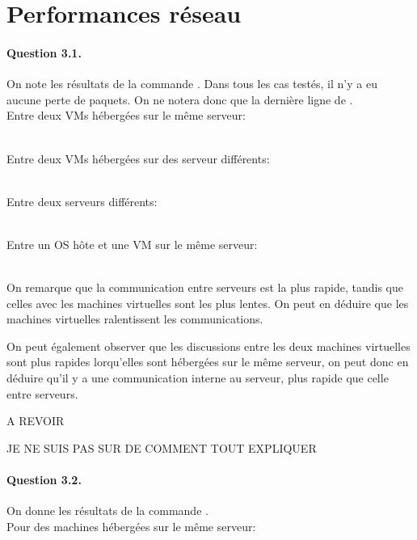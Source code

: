 \documentclass[12pt]{article}
\begin{document}
\section{Performances réseau}
\paragraph{Question 3.1.}
On note les résultats de la commande . Dans tous les cas testés, il n'y a eu aucune perte de paquets. On ne notera donc que la dernière ligne de .
\\

Entre deux VMs hébergées sur le même serveur:

\\

Entre deux VMs hébergées sur des serveur différents:

\\

Entre deux serveurs différents:

\\

Entre un OS hôte et une VM sur le même serveur:

\\

On remarque que la communication entre serveurs est la plus rapide, tandis que celles avec les machines virtuelles sont les plus lentes. On peut en déduire que les machines virtuelles ralentissent les communications.

On peut également observer que les discussions entre les deux machines virtuelles sont plus rapides lorqu'elles sont hébergées sur le même serveur, on peut donc en déduire qu'il y a une communication interne au serveur, plus rapide que celle entre serveurs.



A REVOIR

JE NE SUIS PAS SUR DE COMMENT TOUT EXPLIQUER

\paragraph{Question 3.2.}
On donne les résultats de la commande .
\\

Pour des machines hébergées sur le même serveur:
\end{document}
